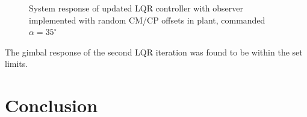 \documentclass[]{aiaa-tc}%
\begin{document}
	\begin{figure}[H]
		\centering
		\caption{System response of updated LQR controller with observer implemented with random CM/CP offsets in plant, commanded $\alpha=35^{\circ}$ }
		\label{fig:LQR2_MC}
	\end{figure}	

	The gimbal response of the second LQR iteration was found to be within the set limits.

	\section{Conclusion}
\end{document}
